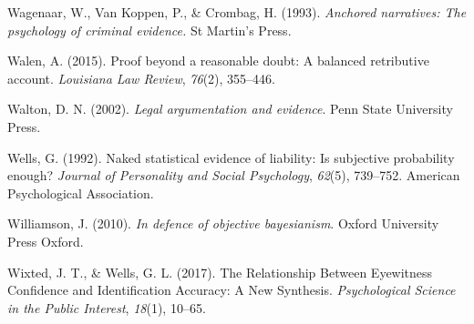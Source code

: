 \documentclass[11pt,dvipsnames,enabledeprecatedfontcommands]{scrartcl}
\begin{document}
\leavevmode\hypertarget{ref-wagenaar1993anchored}{}%
Wagenaar, W., Van Koppen, P., \& Crombag, H. (1993). \emph{Anchored
narratives: The psychology of criminal evidence.} St Martin's Press.

\leavevmode\hypertarget{ref-walen2015}{}%
Walen, A. (2015). Proof beyond a reasonable doubt: A balanced
retributive account. \emph{Louisiana Law Review}, \emph{76}(2),
355--446.

\leavevmode\hypertarget{ref-Walton2002}{}%
Walton, D. N. (2002). \emph{Legal argumentation and evidence}. Penn
State University Press.

\leavevmode\hypertarget{ref-wells1992naked}{}%
Wells, G. (1992). Naked statistical evidence of liability: Is subjective
probability enough? \emph{Journal of Personality and Social Psychology},
\emph{62}(5), 739--752. American Psychological Association.

\leavevmode\hypertarget{ref-williamson2010defence}{}%
Williamson, J. (2010). \emph{In defence of objective bayesianism}.
Oxford University Press Oxford.

\leavevmode\hypertarget{ref-wixted2017RelationshipEyewitnessConfidence}{}%
Wixted, J. T., \& Wells, G. L. (2017). The Relationship Between
Eyewitness Confidence and Identification Accuracy: A New Synthesis.
\emph{Psychological Science in the Public Interest}, \emph{18}(1),
10--65.
\end{document}
